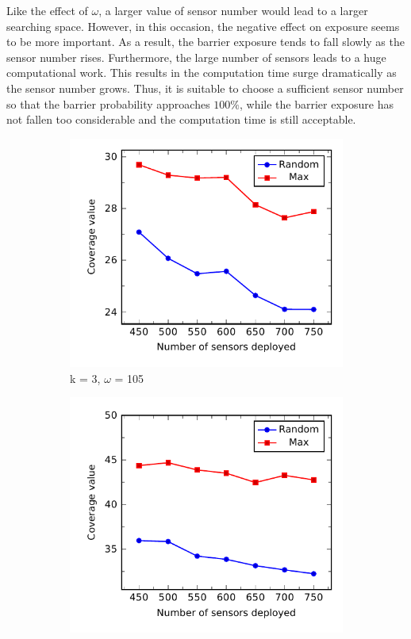 Like the effect of $\omega$, a larger value of sensor number would lead to a larger searching space. However, in this occasion, the negative effect on exposure seems to be more important. As a result, the barrier exposure tends to fall slowly as the sensor number rises. Furthermore, the large number of sensors leads to a huge computational work. This results in the computation time surge dramatically as the sensor number grows. Thus, it is suitable to choose a sufficient sensor number so that the barrier probability approaches $100\%$, while the barrier exposure has not fallen too considerable and the computation time is still acceptable.

\begin{figure}[h]
	\begin{subfigure}{.5\textwidth}
		\centering
		\includegraphics[scale=.8]{Hinhanh/SensorNumberEffect/coverage/k3omega105.pdf}
		\caption{k = 3, $\omega$ = 105}
	\end{subfigure}
	\begin{subfigure}{.5\textwidth}
		\centering
		\includegraphics[scale=.8]{Hinhanh/SensorNumberEffect/coverage/k4omega65.pdf}

\end{subfigure}
\end{figure}
